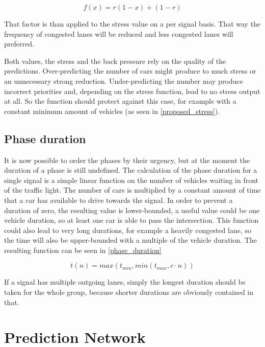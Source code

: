 \begin{equation} \label{stress_reducer}
	f(x) = r (1 - x) + (1 - r)
\end{equation}

That factor is than applied to the stress value on a per signal basis. That way the frequency of congested lanes will be reduced and less congested lanes will preferred.

Both values, the stress and the back pressure rely on the quality of the predictions. Over-predicting the number of cars might produce to much stress or an unnecessary strong reduction. Under-predicting the number may produce incorrect priorities and, depending on the stress function, lead to no stress output at all. So the function should protect against this case, for example with a constant minimum amount of vehicles (as seen in \autoref{proposed_stress}).

\subsection*{Phase duration}

It is now possible to order the phases by their urgency, but at the moment the duration of a phase is still undefined. The calculation of the phase duration for a single signal is a simple linear function on the number of vehicles waiting in front of the traffic light. The number of cars is multiplied by a constant amount of time that a car has available to drive towards the signal. In order to prevent a duration of zero, the resulting value is lower-bounded, a useful value could be one vehicle duration, so at least one car is able to pass the intersection. This function could also lead to very long durations, for example a heavily congested lane, so the time will also be upper-bounded with a multiple of the vehicle duration. The resulting function can be seen in \autoref{phase_duration}

\begin{equation} \label{phase_duration}
t(n)=max\left(t_{min}, min\left(t_{max}, c \cdot n\right)\right)
\end{equation}

If a signal has multiple outgoing lanes, simply the longest duration should be taken for the whole group, because shorter durations are obviously contained in that.

\section{Prediction Network}
\label{predictionNetwork}

